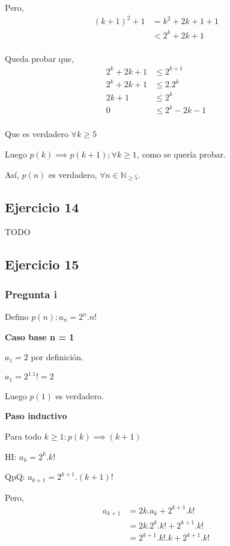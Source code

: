 Pero,
\begin{align*}
    (k+1)^2 +1 &= k^2 + 2k + 1 + 1 \\
    &< 2^k + 2k + 1 \\
\end{align*}

Queda probar que,
\begin{align*}
    2^k + 2k + 1 &\leq 2^{k+1} \\
    2^k + 2k + 1 &\leq 2.2^k \\
    2k + 1 &\leq 2^k\\
    0 &\leq 2^k  - 2k - 1\\
\end{align*}

Que es verdadero $\forall k \geq 5$

Luego $p(k) \implies p(k+1); \forall k \geq 1$, como se quería probar.

Así, $p(n)$ es verdadero, $\forall n \in \mathbb{N}_{\geq 5}$.

\subsection{Ejercicio 14}

TODO

\subsection{Ejercicio 15}

\subsubsection{Pregunta i}

Defino $ p(n): a_n = 2^n.n! $

\textbf{Caso base n = 1}

$ a_1 = 2 $ por definición. 

$ a_1 = 2^1.1! = 2 $

Luego $ p(1) $ es verdadero.

\textbf{Paso inductivo}

Para todo $k \geq 1: p(k) \implies (k+1)$

HI: $ a_k = 2^k.k!$

QpQ: $ a_{k+1} = 2^{k+1}.(k+1)!$

Pero,
\begin{align*}
    a_{k+1} &= 2k . a_k + 2^{k+1}.k! \\
    &= 2k . 2^k.k! + 2^{k+1}.k! \\
    &= 2^{k+1}.k!.k + 2^{k+1}.k! \\
\end{align*}

